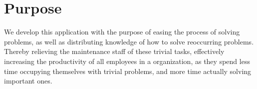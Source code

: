 \section{Purpose}
We develop this application with the purpose of easing the process of solving problems, as well as distributing knowledge of how to solve reoccurring problems. Thereby relieving the maintenance staff of these trivial tasks, effectively increasing the productivity of all employees in a organization, as they spend less time occupying themselves with trivial problems, and more time actually solving important ones.

